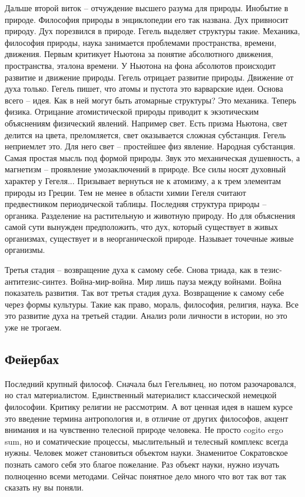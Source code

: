 \documentclass[a4paper, 12pt]{article}
\begin{document}
Дальше второй виток -- отчуждение высшего разума для природы. Инобытие 
в природе. Философия природы в энциклопедии его так названа. Дух 
привносит природу. Дух порезвился в природе. Гегель выделяет структуры 
такие. Механика, философия природы, наука занимается проблемами 
пространства, времени, движения. Первым критикует Ньютона за понятие 
абсолютного движения, пространства, эталона времени. У Ньютона на фона 
абсолютов происходит развитие и движение природы. Гегель отрицает 
развитие природы. Движение от духа только. Гегель пишет, что атомы 
и пустота это варварские идеи. Основа всего -- идея. Как в ней могут 
быть атомарные структуры? Это механика. Теперь физика. Отрицание 
атомистической природы приводит к экзотическим объяснениям физический 
явлений. Например свет. Есть призма Ньютона, свет делится на цвета, 
преломляется, свет оказывается сложная субстанция. Гегель неприемлет 
это. Для него свет -- простейшее физ явление. Народная субстанция. Самая 
простая мысль под формой природы. Звук это механическая душевность, 
а магнетизм -- проявление умозаключений в природе. Все силы носят 
духовный характер у Гегеля... Призывает вернуться не к атомизму, 
а к трем элементам природы из Греции. Тем не менее в области химии 
Гегеля считают предвестником периодической таблицы. Последняя структура 
природы -- органика. Разделение на растительную и животную природу. Но 
для объяснения самой сути вынужден предположить, что дух, который 
существует в живых организмах, существует и в неорганической природе. 
Называет точечные живые организмы.

Третья стадия -- возвращение духа к самому себе. Снова триада, как 
в тезис-антитезис-синтез. Война-мир-война. Мир лишь пауза между войнами. 
Война показатель развития. Так вот третья стадия духа. Возвращение 
к самому себе через формы культуры. Такие как право, мораль, философия, 
религия, наука. Все это развитие духа на третьей стадии. Анализ роли 
личности в истории, но это уже не трогаем.

\subsection{Фейербах}
Последний крупный философ. Сначала был Гегельянец, но потом 
разочаровался, но стал материалистом. Единственный материалист 
классической немецкой философии. Критику религии не рассмотрим. А вот 
ценная идея в нашем курсе это введение термина антропология и, в отличие 
от других философов, акцент внимания и на чувственно телесной природе 
человека. Не просто cogito ergo sum, но и соматические процессы, 
мыслительный и телесный комплекс всегда нужны. Человек может становиться 
объектом науки. Знаменитое Сократовское познать самого себя это благое 
пожелание. Раз объект науки, нужно изучать полноценно всеми методами. 
Сейчас понятное дело много что вот так вот так сказать ну вы поняли.
\end{document}
